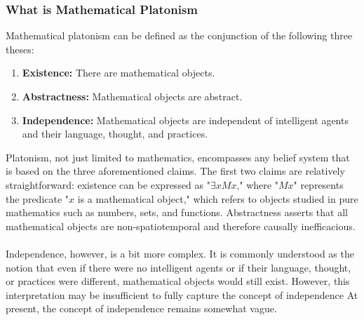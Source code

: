 \documentclass[10pt,a4paper]{article}
\begin{document}
                    \subsubsection{What is Mathematical Platonism}
                        Mathematical platonism can be defined as the conjunction of the following three theses:
                        \begin{enumerate}
                            \item  \textbf{Existence: }There are mathematical objects.
                            \item  \textbf{Abstractness:} Mathematical objects are abstract.
                            \item  \textbf{Independence:} Mathematical objects are independent of intelligent agents and their language, thought, and practices.
                        \end{enumerate}
                        Platonism, not just limited to mathematics, encompasses any belief system that is based on the three aforementioned claims. The first two claims are relatively straightforward: existence can be expressed as "$\exists xMx$," where "$Mx$" represents the predicate "$x$ is a mathematical object," which refers to objects studied in pure mathematics such as numbers, sets, and functions. Abstractness asserts that all mathematical objects are non-spatiotemporal and therefore causally inefficacious. \cite{sep-platonism-mathematics}
                        \\
                        \\
                        Independence, however, is a bit more complex. It is commonly understood as the notion that even if there were no intelligent agents or if their language, thought, or practices were different, mathematical objects would still exist. However, this interpretation may be insufficient to fully capture the concept of independence At present, the concept of independence remains somewhat vague.
\end{document}
